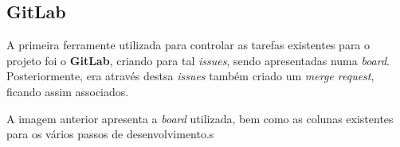 \subsection{GitLab}

A primeira ferramente utilizada para controlar as tarefas existentes para o projeto foi o \textbf{GitLab}, criando para tal \textit{issues}, sendo apresentadas numa \textit{board}. Posteriormente, era através destsa \textit{issues} também criado um \textit{merge request}, ficando assim associados.


A imagem anterior apresenta a \textit{board} utilizada, bem como as colunas existentes para os vários passos de desenvolvimento.s
